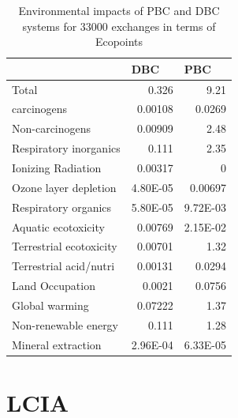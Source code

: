 \documentclass[conference]{IEEEtran}
\begin{document}
\begin{table}[htbp]
\caption{Environmental impacts of PBC and DBC systems for 33000 exchanges in terms of Ecopoints}
\begin{center}
\begin{tabular}{|l|r|r|}
\hline
 & \multicolumn{1}{l|}{DBC} & \multicolumn{1}{l|}{PBC} \\ \hline
Total & 0.326 & 9.21 \\ \hline
carcinogens & 0.00108 & 0.0269 \\ \hline
Non-carcinogens & 0.00909 & 2.48 \\ \hline
Respiratory inorganics & 0.111 & 2.35 \\ \hline
Ionizing Radiation & 0.00317 & 0 \\ \hline
Ozone layer depletion & 4.80E-05 & 0.00697 \\ \hline
Respiratory organics & 5.80E-05 & 9.72E-03 \\ \hline
Aquatic ecotoxicity & 0.00769 & 2.15E-02 \\ \hline
Terrestrial ecotoxicity & 0.00701 & 1.32 \\ \hline
Terrestrial acid/nutri & 0.00131 & 0.0294 \\ \hline
Land Occupation & 0.0021 & 0.0756 \\ \hline
Global warming & 0.07222 & 1.37 \\ \hline
Non-renewable energy & 0.111 & 1.28 \\ \hline
Mineral extraction & 2.96E-04 & 6.33E-05 \\ \hline
\end{tabular}
\end{center}
\label{exchange_masdar}
\end{table}



\section{LCIA}
\end{document}
